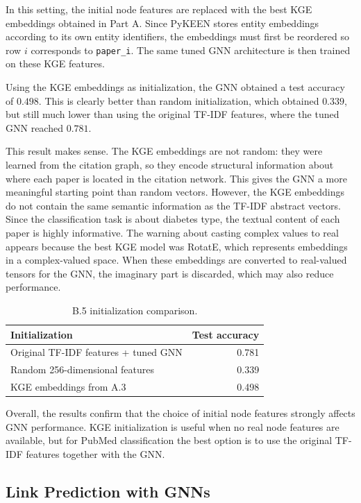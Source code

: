 \documentclass[11pt]{article}
\begin{document}
In this setting, the initial node features are replaced with the best KGE embeddings obtained in Part A. Since PyKEEN stores entity embeddings according to its own entity identifiers, the embeddings must first be reordered so row $i$ corresponds to \texttt{paper\_i}. The same tuned GNN architecture is then trained on these KGE features.

Using the KGE embeddings as initialization, the GNN obtained a test accuracy of $0.498$. This is clearly better than random initialization, which obtained $0.339$, but still much lower than using the original TF-IDF features, where the tuned GNN reached $0.781$.

This result makes sense. The KGE embeddings are not random: they were learned from the citation graph, so they encode structural information about where each paper is located in the citation network. This gives the GNN a more meaningful starting point than random vectors. However, the KGE embeddings do not contain the same semantic information as the TF-IDF abstract vectors. Since the classification task is about diabetes type, the textual content of each paper is highly informative. The warning about casting complex values to real appears because the best KGE model was RotatE, which represents embeddings in a complex-valued space. When these embeddings are converted to real-valued tensors for the GNN, the imaginary part is discarded, which may also reduce performance.

\begin{table}[H]
\centering
\caption{B.5 initialization comparison.}
\begin{tabular}{lr}
\toprule
Initialization & Test accuracy \\
\midrule
Original TF-IDF features + tuned GNN & 0.781 \\
Random 256-dimensional features & 0.339 \\
KGE embeddings from A.3 & 0.498 \\
\bottomrule
\end{tabular}
\end{table}

Overall, the results confirm that the choice of initial node features strongly affects GNN performance. KGE initialization is useful when no real node features are available, but for PubMed classification the best option is to use the original TF-IDF features together with the GNN.

\subsection{Link Prediction with GNNs}
\end{document}
